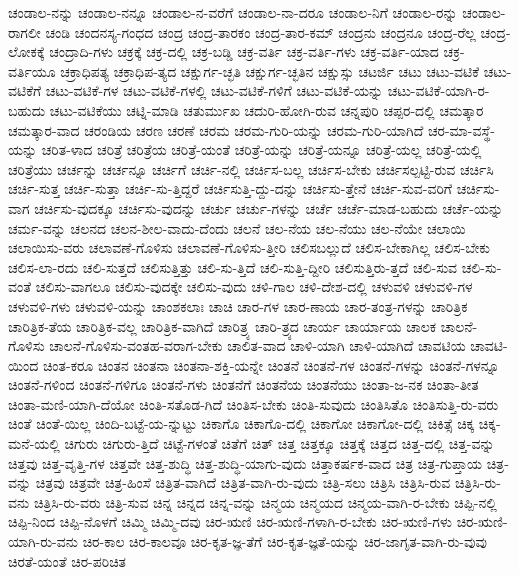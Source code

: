 {ಚಂಡಾಲ-ನನ್ನು
ಚಂಡಾಲ-ನನ್ನೂ
ಚಂಡಾಲ-ನ-ವರೆಗೆ
ಚಂಡಾಲ-ನಾ-ದರೂ
ಚಂಡಾಲ-ನಿಗೆ
ಚಂಡಾಲ-ರನ್ನು
ಚಂಡಾಲ-ರಾಗಲೀ
ಚಂಡಿ
ಚಂದನಸ್ಯ-ಗಂಧದ
ಚಂದ್ರ
ಚಂದ್ರ-ತಾರಕಂ
ಚಂದ್ರ-ತಾರ-ಕಮ್
ಚಂದ್ರನು
ಚಂದ್ರನೂ
ಚಂದ್ರ-ರೆಲ್ಲ
ಚಂದ್ರ-ಲೋಕಕ್ಕೆ
ಚಂದ್ರಾದಿ-ಗಳು
ಚಕ್ರಕ್ಕೆ
ಚಕ್ರ-ದಲ್ಲಿ
ಚಕ್ರ-ಬಡ್ಡಿ
ಚಕ್ರ-ವರ್ತಿ
ಚಕ್ರ-ವರ್ತಿ-ಗಳು
ಚಕ್ರ-ವರ್ತಿ-ಯಾದ
ಚಕ್ರ-ವರ್ತಿಯೂ
ಚಕ್ರಾಧಿಪತ್ಯ
ಚಕ್ರಾಧಿಪ-ತ್ಯದ
ಚಕ್ಷುರ್ಗ-ಚ್ಛತಿ
ಚಕ್ಷುರ್ಗ-ಚ್ಛತಿನ
ಚಕ್ಷುಸ್ಸು
ಚಟರ್ಜಿ
ಚಟು
ಚಟು-ವಟಿಕೆ
ಚಟು-ವಟಿಕೆಗೆ
ಚಟು-ವಟಿಕೆ-ಗಳ
ಚಟು-ವಟಿಕೆ-ಗಳಲ್ಲಿ
ಚಟು-ವಟಿಕೆ-ಗಳಿಗೆ
ಚಟು-ವಟಿಕೆ-ಯನ್ನು
ಚಟು-ವಟಿಕೆ-ಯಾಗಿ-ರ-ಬಹುದು
ಚಟು-ವಟಿಕೆಯು
ಚಟ್ನಿ-ಮಾಡಿ
ಚತುರ್ಮುಖ
ಚದುರಿ-ಹೋಗಿ-ರುವ
ಚನ್ನಪುರಿ
ಚಪ್ಪರ-ದಲ್ಲಿ
ಚಮತ್ಕಾರ
ಚಮತ್ಕಾರ-ವಾದ
ಚರಂಡಿಯ
ಚರಣ
ಚರಣೆ
ಚರಮ
ಚರಮ-ಗುರಿ-ಯನ್ನು
ಚರಮ-ಗುರಿ-ಯಾಗಿದೆ
ಚರ-ಮಾ-ವಸ್ಥೆ-ಯನ್ನು
ಚರಿತ-ಳಾದ
ಚರಿತ್ರೆ
ಚರಿತ್ರೆಯ
ಚರಿತ್ರೆ-ಯಂತೆ
ಚರಿತ್ರೆ-ಯನ್ನು
ಚರಿತ್ರೆ-ಯನ್ನೂ
ಚರಿತ್ರೆ-ಯಲ್ಲ
ಚರಿತ್ರೆ-ಯಲ್ಲಿ
ಚರಿತ್ರೆಯು
ಚರ್ಚನ್ನು
ಚರ್ಚನ್ನೂ
ಚರ್ಚಿಗೆ
ಚರ್ಚಿ-ನಲ್ಲಿ
ಚರ್ಚಿಸ-ಬಲ್ಲ
ಚರ್ಚಿಸ-ಬೇಕು
ಚರ್ಚಿಸಲ್ಪಟ್ಟಿ-ರುವ
ಚರ್ಚಿಸಿ
ಚರ್ಚಿ-ಸುತ್ತ
ಚರ್ಚಿ-ಸುತ್ತಾ
ಚರ್ಚಿ-ಸು-ತ್ತಿದ್ದರೆ
ಚರ್ಚಿಸುತ್ತಿ-ದ್ದು-ದನ್ನು
ಚರ್ಚಿಸು-ತ್ತೇನೆ
ಚರ್ಚಿ-ಸುವ-ವರಿಗೆ
ಚರ್ಚಿಸು-ವಾಗ
ಚರ್ಚಿಸು-ವುದಕ್ಕೂ
ಚರ್ಚಿಸು-ವುದನ್ನು
ಚರ್ಚು
ಚರ್ಚು-ಗಳನ್ನು
ಚರ್ಚೆ
ಚರ್ಚೆ-ಮಾಡ-ಬಹುದು
ಚರ್ಚೆ-ಯನ್ನು
ಚರ್ಮ-ವನ್ನು
ಚಲನದ
ಚಲನ-ಶೀಲ-ವಾದು-ದೆಂದು
ಚಲನೆ
ಚಲ-ನೆಯ
ಚಲ-ನೆಯು
ಚಲ-ನೆಯೇ
ಚಲಾಯಿ
ಚಲಾಯಿಸು-ವರು
ಚಲಾವಣೆ-ಗೊಳಿಸು
ಚಲಾವಣೆ-ಗೊಳಿಸು-ತ್ತೀರಿ
ಚಲಿಸಬಲ್ಲುದೆ
ಚಲಿಸ-ಬೇಕಾಗಿಲ್ಲ
ಚಲಿಸ-ಬೇಕು
ಚಲಿಸ-ಲಾ-ರದು
ಚಲಿ-ಸುತ್ತದೆ
ಚಲಿಸುತ್ತಿತ್ತು
ಚಲಿ-ಸು-ತ್ತಿದೆ
ಚಲಿ-ಸುತ್ತಿ-ದ್ದೀರಿ
ಚಲಿಸುತ್ತಿರು-ತ್ತದೆ
ಚಲಿ-ಸುವ
ಚಲಿ-ಸು-ವಂತೆ
ಚಲಿಸು-ವಾಗಲೂ
ಚಲಿಸು-ವುದಕ್ಕೇ
ಚಲಿಸು-ವುದು
ಚಳಿ-ಗಾಲ
ಚಳಿ-ದೇಶ-ದಲ್ಲಿ
ಚಳುವಳಿ
ಚಳುವಳಿ-ಗಳ
ಚಳುವಳಿ-ಗಳು
ಚಳುವಳಿ-ಯನ್ನು
ಚಾಂಶಕಲಾಃ
ಚಾಚಿ
ಚಾರ-ಗಳ
ಚಾರ-ಣಾಯ
ಚಾರ-ತಂತ್ರ-ಗಳನ್ನು
ಚಾರಿತ್ರಿಕ
ಚಾರಿತ್ರಿಕ-ತೆಯ
ಚಾರಿತ್ರಿಕ-ವಲ್ಲ
ಚಾರಿತ್ರಿಕ-ವಾಗಿದೆ
ಚಾರಿತ್ರ್ಯ
ಚಾರಿ-ತ್ರ್ಯದ
ಚಾರ್ಯ
ಚಾರ್ಯಾಯ
ಚಾಲಕ
ಚಾಲನೆ-ಗೊಳಿಸು
ಚಾಲನೆ-ಗೊಳಿಸು-ವಂತಹ-ವರಾಗ-ಬೇಕು
ಚಾಲಿತ-ವಾದ
ಚಾಳಿ-ಯಾಗಿ
ಚಾಳಿ-ಯಾಗಿದೆ
ಚಾವಟಿಯ
ಚಾವಟಿ-ಯಿಂದ
ಚಿಂತ-ಕರೂ
ಚಿಂತನ
ಚಿಂತನಾ
ಚಿಂತನಾ-ಶಕ್ತಿ-ಯನ್ನೇ
ಚಿಂತನೆ
ಚಿಂತನೆ-ಗಳ
ಚಿಂತನೆ-ಗಳನ್ನು
ಚಿಂತನೆ-ಗಳನ್ನೂ
ಚಿಂತನೆ-ಗಳಿಂದ
ಚಿಂತನೆ-ಗಳಿಗೂ
ಚಿಂತನೆ-ಗಳು
ಚಿಂತನೆಗೆ
ಚಿಂತನೆಯ
ಚಿಂತನೆಯು
ಚಿಂತಾ-ಜ-ನಕ
ಚಿಂತಾ-ತೀತ
ಚಿಂತಾ-ಮಣಿ-ಯಾಗಿ-ದೆಯೋ
ಚಿಂತಿ-ಸತೊಡ-ಗಿದೆ
ಚಿಂತಿಸ-ಬೇಕು
ಚಿಂತಿ-ಸುವುದು
ಚಿಂತಿಸಿತೊ
ಚಿಂತಿಸುತ್ತಿ-ರು-ವರು
ಚಿಂತೆ
ಚಿಂತೆ-ಯಿಲ್ಲ
ಚಿಂದಿ-ಬಟ್ಟೆ-ಯ-ನ್ನುಟ್ಟು
ಚಿಕಾಗೊ
ಚಿಕಾಗೊ-ದಲ್ಲಿ
ಚಿಕಾಗೋ
ಚಿಕಾಗೋ-ದಲ್ಲಿ
ಚಿಕಿತ್ಸೆ
ಚಿಕ್ಕ
ಚಿಕ್ಕ-ಮನೆ-ಯಲ್ಲಿ
ಚಿಗುರು
ಚಿಗುರು-ತ್ತಿದೆ
ಚಿಟ್ಟೆ-ಗಳಂತೆ
ಚಿತೆಗೆ
ಚಿತ್
ಚಿತ್ತ
ಚಿತ್ತಕ್ಕೂ
ಚಿತ್ತಕ್ಕೆ
ಚಿತ್ತದ
ಚಿತ್ತ-ದಲ್ಲಿ
ಚಿತ್ತ-ವನ್ನು
ಚಿತ್ತವು
ಚಿತ್ತ-ವೃತ್ತಿ-ಗಳ
ಚಿತ್ತವೇ
ಚಿತ್ತ-ಶುದ್ಧಿ
ಚಿತ್ತ-ಶುದ್ಧಿ-ಯಾಗು-ವುದು
ಚಿತ್ತಾಕರ್ಷಕ-ವಾದ
ಚಿತ್ರ
ಚಿತ್ರ-ಗುಪ್ತಾಯ
ಚಿತ್ರ-ವನ್ನು
ಚಿತ್ರವು
ಚಿತ್ರವೇ
ಚಿತ್ರ-ಹಿಂಸೆ
ಚಿತ್ರಿತ-ವಾಗಿದೆ
ಚಿತ್ರಿತ-ವಾಗಿ-ರು-ವುದು
ಚಿತ್ರಿ-ಸಲು
ಚಿತ್ರಿಸಿ
ಚಿತ್ರಿಸಿ-ರುವ
ಚಿತ್ರಿಸಿ-ರು-ವನು
ಚಿತ್ರಿಸಿ-ರು-ವರು
ಚಿತ್ರಿ-ಸುವ
ಚಿನ್ನ
ಚಿನ್ನದ
ಚಿನ್ನ-ವನ್ನು
ಚಿನ್ಮಯ
ಚಿನ್ಮಯದ
ಚಿನ್ಮಯ-ವಾಗಿ-ರ-ಬೇಕು
ಚಿಪ್ಪಿ-ನಲ್ಲಿ
ಚಿಪ್ಪಿ-ನಿಂದ
ಚಿಪ್ಪಿ-ನೊಳಗೆ
ಚಿಮ್ಮಿ
ಚಿಮ್ಮಿ-ದವು
ಚಿರ-ಋಣಿ
ಚಿರ-ಋಣಿ-ಗಳಾಗಿ-ರ-ಬೇಕು
ಚಿರ-ಋಣಿ-ಗಳು
ಚಿರ-ಋಣಿ-ಯಾಗಿ-ರು-ವನು
ಚಿರ-ಕಾಲ
ಚಿರ-ಕಾಲವೂ
ಚಿರ-ಕೃತ-ಜ್ಞ-ತೆಗೆ
ಚಿರ-ಕೃತ-ಜ್ಞತೆ-ಯನ್ನು
ಚಿರ-ಜಾಗೃತ-ವಾಗಿ-ರು-ವುವು
ಚಿರತೆ-ಯಂತೆ
ಚಿರ-ಪರಿಚಿತ
}
